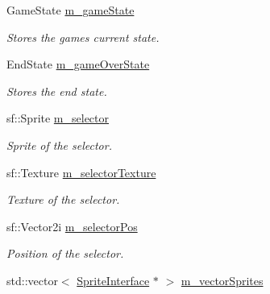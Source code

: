 \begin{DoxyCompactItemize}
\mbox{\label{class_scene_ab736eefd11ca6f4b90c0240895c316c4}} 
Game\+State \mbox{\hyperlink{class_scene_ab736eefd11ca6f4b90c0240895c316c4}{m\+\_\+game\+State}}
\begin{DoxyCompactList}\small\item\em Stores the games current state. \end{DoxyCompactList}\item 
\mbox{\label{class_scene_abf242918885f639abdb059385a35dfda}} 
End\+State \mbox{\hyperlink{class_scene_abf242918885f639abdb059385a35dfda}{m\+\_\+game\+Over\+State}}
\begin{DoxyCompactList}\small\item\em Stores the end state. \end{DoxyCompactList}\item 
\mbox{\label{class_scene_aa2a82603f5db50e33fae8f444c6986ac}} 
sf\+::\+Sprite \mbox{\hyperlink{class_scene_aa2a82603f5db50e33fae8f444c6986ac}{m\+\_\+selector}}
\begin{DoxyCompactList}\small\item\em Sprite of the selector. \end{DoxyCompactList}\item 
\mbox{\label{class_scene_a1bfd679d50e896a6e56e73690001eb8b}} 
sf\+::\+Texture \mbox{\hyperlink{class_scene_a1bfd679d50e896a6e56e73690001eb8b}{m\+\_\+selector\+Texture}}
\begin{DoxyCompactList}\small\item\em Texture of the selector. \end{DoxyCompactList}\item 
\mbox{\label{class_scene_a30daf51f6f59d17c526be427856457ce}} 
sf\+::\+Vector2i \mbox{\hyperlink{class_scene_a30daf51f6f59d17c526be427856457ce}{m\+\_\+selector\+Pos}}
\begin{DoxyCompactList}\small\item\em Position of the selector. \end{DoxyCompactList}\item 
\mbox{\label{class_scene_ae5339ca6ff15be177b1ed83f5a894801}} 
std\+::vector$<$ \mbox{\hyperlink{class_sprite_interface}{Sprite\+Interface}} $\ast$ $>$ \mbox{\hyperlink{class_scene_ae5339ca6ff15be177b1ed83f5a894801}{m\+\_\+vector\+Sprites}}

\end{DoxyCompactItemize}
